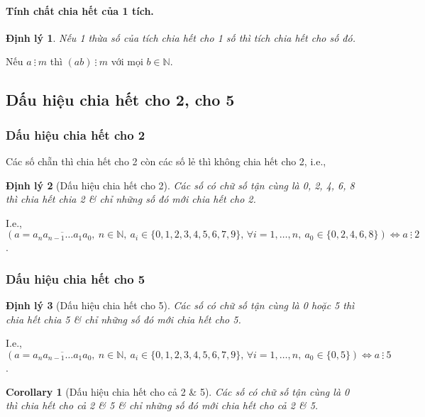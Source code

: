 \documentclass{article}
\numberwithin{equation}{section}
\newtheorem{corollary}{Corollary}[section]
\newtheorem{theorem}{Định lý}[section]
\begin{document}
\paragraph{Tính chất chia hết của 1 tích.}
\begin{theorem}
	Nếu 1 thừa số của tích chia hết cho 1 số thì tích chia hết cho số đó.
\end{theorem}
Nếu $a\ \vdots\ m$  thì $(ab)\ \vdots\ m$ với mọi $b\in\mathbb{N}$.

\subsection{Dấu hiệu chia hết cho 2, cho 5}

\subsubsection{Dấu hiệu chia hết cho 2}
Các số chẵn thì chia hết cho 2 còn các số lẻ thì không chia hết cho 2, i.e.,

\begin{theorem}[Dấu hiệu chia hết cho 2]
	Các số có chữ số tận cùng là 0, 2, 4, 6, 8 thì chia hết chia 2 \& chỉ những số đó mới chia hết cho 2.
\end{theorem}
I.e., $(a = \overline{a_na_{n-1}\ldots a_1a_0},\ n\in\mathbb{N},\ a_i\in\{0,1,2,3,4,5,6,7,9\},\,\forall i = 1,\ldots,n,\ a_0\in\{0,2,4,6,8\})\Leftrightarrow a\ \vdots\ 2$.

\subsubsection{Dấu hiệu chia hết cho 5}
\begin{theorem}[Dấu hiệu chia hết cho 5]
	Các số có chữ số tận cùng là 0 hoặc 5 thì chia hết chia 5 \& chỉ những số đó mới chia hết cho 5.
\end{theorem}
I.e., $(a = \overline{a_na_{n-1}\ldots a_1a_0},\ n\in\mathbb{N},\ a_i\in\{0,1,2,3,4,5,6,7,9\},\,\forall i = 1,\ldots,n,\ a_0\in\{0,5\})\Leftrightarrow a\ \vdots\ 5$.

\begin{corollary}[Dấu hiệu chia hết cho cả 2 \& 5]
	Các số có chữ số tận cùng là 0 thì chia hết cho cả 2 \& 5 \& chỉ những số đó mới chia hết cho cả 2 \& 5.
\end{corollary}
\end{document}

